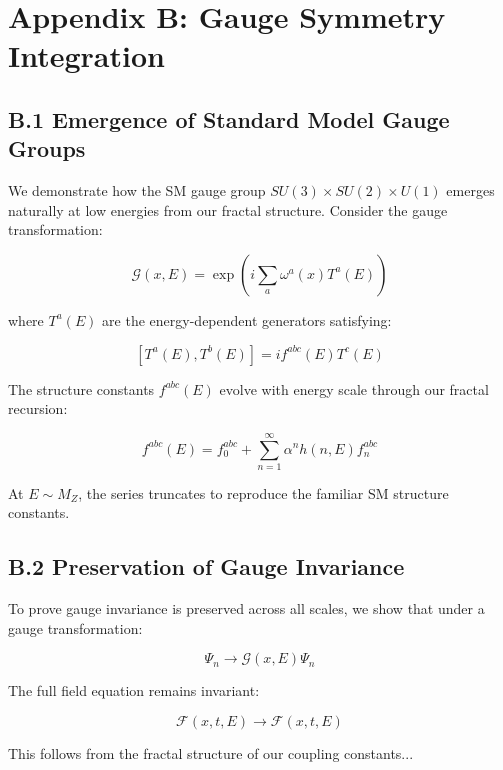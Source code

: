 \section*{Appendix B: Gauge Symmetry Integration}
\label{app:gauge_symmetry}

\subsection*{B.1 Emergence of Standard Model Gauge Groups}
\label{subsec:sm_gauge_groups}

We demonstrate how the SM gauge group $SU(3)\times SU(2)\times U(1)$ emerges naturally at low energies from our fractal structure. Consider the gauge transformation:

\[
\mathcal{G}(x, E) = \exp\left(i\sum_{a} \omega^a(x) T^a(E)\right)
\]

where $T^a(E)$ are the energy-dependent generators satisfying:

\[
[T^a(E), T^b(E)] = if^{abc}(E)T^c(E)
\]

The structure constants $f^{abc}(E)$ evolve with energy scale through our fractal recursion:

\[
f^{abc}(E) = f^{abc}_0 + \sum_{n=1}^{\infty} \alpha^n h(n,E) f^{abc}_n
\]

At $E \sim M_Z$, the series truncates to reproduce the familiar SM structure constants.

\subsection*{B.2 Preservation of Gauge Invariance}
\label{subsec:gauge_invariance}

To prove gauge invariance is preserved across all scales, we show that under a gauge transformation:

\[
\Psi_n \rightarrow \mathcal{G}(x,E)\Psi_n
\]

The full field equation remains invariant:

\[
\mathcal{F}(x,t,E) \rightarrow \mathcal{F}(x,t,E)
\]

This follows from the fractal structure of our coupling constants...